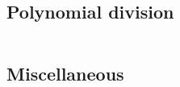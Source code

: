 \documentclass[a4paper,10pt]{article}
\begin{document}
\begin{lstlisting}
\end{lstlisting}
\begin{quote}
\end{quote}

\subsection{Polynomial division}

\begin{lstlisting}
\end{lstlisting}
\begin{quote}
\end{quote}




\subsection{Miscellaneous}

\begin{lstlisting}
\end{lstlisting}
\begin{quote}
\end{quote}




\end{document}
